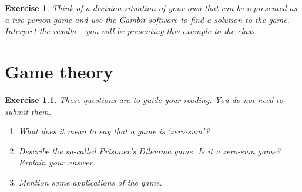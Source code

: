 \documentclass{book}
\newtheorem{exercise}{Exercise}
\begin{document}
\begin{exercise}
Think of a decision situation of your own that can be represented as
a two person game and use the Gambit software to find a solution
to the game. Interpret the results -- you will be presenting this
example to the class. 
\end{exercise}
\begin{solution}
\end{solution}



\chapter{Game theory}

\begin{exercise}
These questions are to guide your reading. You do not need to submit them.
\begin{enumerate}

\item What does it mean to say that a game is `zero-sum'?

\item Describe the so-called Prisoner's Dilemma game. Is it a zero-sum game?
Explain your answer.

\item Mention some applications of the game.

\end{enumerate}
\end{exercise}
\begin{solution}
\end{solution}
\end{document}
